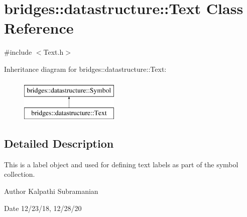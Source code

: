 \hypertarget{classbridges_1_1datastructure_1_1_text}{}\section{bridges\+:\+:datastructure\+:\+:Text Class Reference}
\label{classbridges_1_1datastructure_1_1_text}


{\ttfamily \#include $<$Text.\+h$>$}

Inheritance diagram for bridges\+:\+:datastructure\+:\+:Text\+:\begin{figure}[H]
\begin{center}
\leavevmode
\includegraphics[height=2.000000cm]{classbridges_1_1datastructure_1_1_text}
\end{center}
\end{figure}


\subsection{Detailed Description}
This is a label object and used for defining text labels as part of the symbol collection. 

\begin{DoxyAuthor}{Author}
Kalpathi Subramanian 
\end{DoxyAuthor}
\begin{DoxyDate}{Date}
12/23/18, 12/28/20 
\end{DoxyDate}
